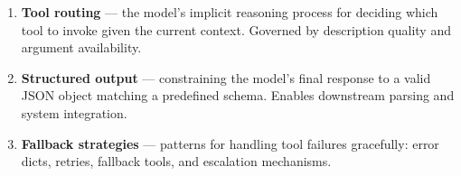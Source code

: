 \documentclass[12pt, a4paper]{article}
\newcommand{\kterm}[1]{\textbf{\textcolor{keyterm}{#1}}}
\begin{document}
\begin{theorybox}
\begin{enumerate}[leftmargin=*, label=\textbf{\arabic*.}, itemsep=4pt]
  \item \kterm{Tool routing} --- the model's implicit reasoning process for deciding which tool to invoke given the current context. Governed by description quality and argument availability.

  \item \kterm{Structured output} --- constraining the model's final response to a valid JSON object matching a predefined schema. Enables downstream parsing and system integration.

  \item \kterm{Fallback strategies} --- patterns for handling tool failures gracefully: error dicts, retries, fallback tools, and escalation mechanisms.
\end{enumerate}

\end{theorybox}

\vspace{1.5em}
\end{document}
